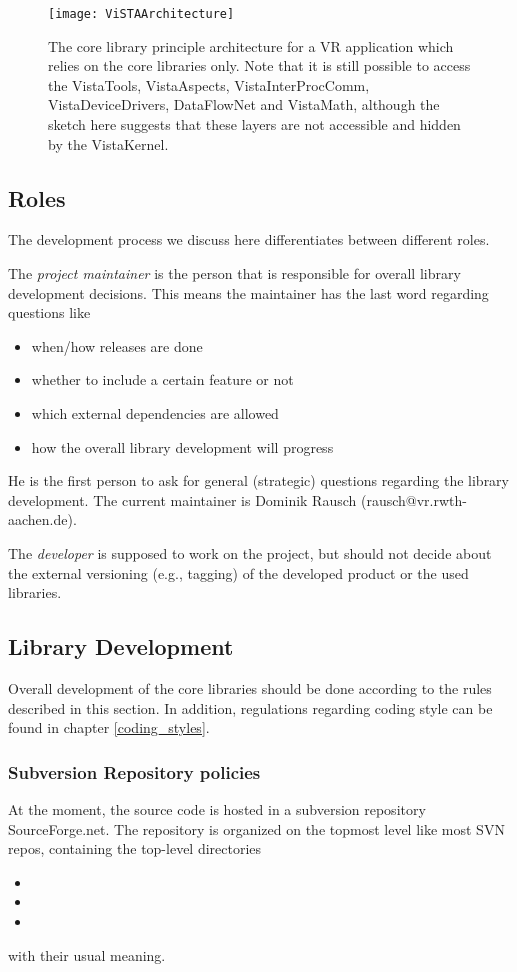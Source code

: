 \begin{figure}
\begin{center}
\texttt{[image: ViSTAArchitecture]}
\end{center}
\caption{\label{fig:ViSTAArchitecture}
  The  core library principle architecture for a VR application which relies on the  core libraries only.
  Note that it is still possible to access the VistaTools, VistaAspects, VistaInterProcComm, VistaDeviceDrivers, DataFlowNet and VistaMath, although the sketch here suggests that these layers are not accessible and hidden by the VistaKernel.}
\end{figure}
 
\subsection{Roles}
The development process we discuss here differentiates between different roles.

The \textit{project maintainer} is the person that is responsible for overall library development decisions.
This means the maintainer has the last word regarding questions like
\begin{itemize}
\item when/how releases are done
\item whether to include a certain feature or not
\item which external dependencies are allowed
\item how the overall library development will progress
\end{itemize}
He is the first person to ask for general (strategic) questions regarding the library development.
The current  maintainer is Dominik Rausch (rausch@vr.rwth-aachen.de).

The \textit{developer} is supposed to work on the project, but should not decide about the external versioning (e.g., tagging) of the developed product or the used libraries.

\subsection{Library Development}
Overall development of the  core libraries should be done according to the rules described in this section.
In addition, regulations regarding coding style can be found in chapter \ref{coding_styles}.

\subsubsection{Subversion Repository policies}
At the moment, the  source code is hosted in a subversion repository SourceForge.net.
The repository is organized on the topmost level like most SVN repos, containing the top-level directories
\begin{itemize}
\item{}
\item{}
\item{}
\end{itemize}
with their usual meaning.

